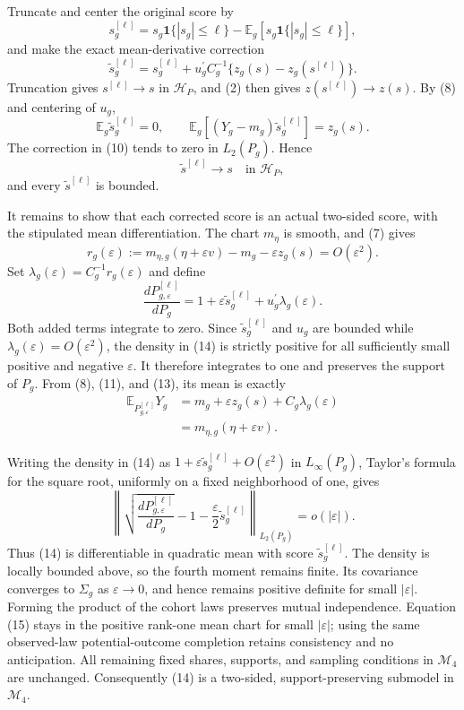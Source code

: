 Truncate and center the original score by
\[
s_g^{[\ell]}
=s_g\mathbf 1\{|s_g|\le\ell\}
-\mathbb E_g[s_g\mathbf 1\{|s_g|\le\ell\}],
\]
and make the exact mean-derivative correction
\[
\widetilde s_g^{[\ell]}
=s_g^{[\ell]}
+u_g^{\prime}C_g^{-1}\{z_g(s)-z_g(s^{[\ell]})\}.                       \tag{10}
\]
Truncation gives \(s^{[\ell]}\to s\) in \(\mathcal H_P\), and (2) then gives
\(z(s^{[\ell]})\to z(s)\).  By (8) and centering of \(u_g\),
\[
\mathbb E_g\widetilde s_g^{[\ell]}=0,
\qquad
\mathbb E_g[(Y_g-m_g)\widetilde s_g^{[\ell]}]=z_g(s).                 \tag{11}
\]
The correction in (10) tends to zero in \(L_2(P_g)\).  Hence
\[
\widetilde s^{[\ell]}\longrightarrow s
\quad\text{in }\mathcal H_P,                                          \tag{12}
\]
and every \(\widetilde s^{[\ell]}\) is bounded.

It remains to show that each corrected score is an actual two-sided score, with the stipulated mean differentiation.  The chart \(m_\eta\) is smooth, and (7) gives
\[
r_g(\varepsilon)
:=m_{\eta,g}(\eta+\varepsilon v)-m_g-\varepsilon z_g(s)
=O(\varepsilon^2).                                                       \tag{13}
\]
Set \(\lambda_g(\varepsilon)=C_g^{-1}r_g(\varepsilon)\) and define
\[
\frac{dP_{g,\varepsilon}^{[\ell]}}{dP_g}
=1+\varepsilon\widetilde s_g^{[\ell]}
+u_g^{\prime}\lambda_g(\varepsilon).                                  \tag{14}
\]
Both added terms integrate to zero.  Since \(\widetilde s_g^{[\ell]}\) and \(u_g\) are bounded while \(\lambda_g(\varepsilon)=O(\varepsilon^2)\), the density in (14) is strictly positive for all sufficiently small positive and negative \(\varepsilon\).  It therefore integrates to one and preserves the support of \(P_g\).  From (8), (11), and (13), its mean is exactly
\[
\begin{aligned}
\mathbb E_{P_{g,\varepsilon}^{[\ell]}}Y_g
&=m_g+\varepsilon z_g(s)+C_g\lambda_g(\varepsilon)\\
&=m_{\eta,g}(\eta+\varepsilon v).                                    \tag{15}
\end{aligned}
\]

Writing the density in (14) as \(1+\varepsilon\widetilde s_g^{[\ell]}+O(\varepsilon^2)\) in \(L_\infty(P_g)\), Taylor's formula for the square root, uniformly on a fixed neighborhood of one, gives
\[
\left\|
\sqrt{\frac{dP_{g,\varepsilon}^{[\ell]}}{dP_g}}
-1-\frac{\varepsilon}{2}\widetilde s_g^{[\ell]}
\right\|_{L_2(P_g)}=o(|\varepsilon|).                                  \tag{16}
\]
Thus (14) is differentiable in quadratic mean with score \(\widetilde s_g^{[\ell]}\).  The density is locally bounded above, so the fourth moment remains finite.  Its covariance converges to \(\Sigma_g\) as \(\varepsilon\to0\), and hence remains positive definite for small \(|\varepsilon|\).  Forming the product of the cohort laws preserves mutual independence.  Equation (15) stays in the positive rank-one mean chart for small \(|\varepsilon|\); using the same observed-law potential-outcome completion retains consistency and no anticipation.  All remaining fixed shares, supports, and sampling conditions in \(\mathcal M_4\) are unchanged.  Consequently (14) is a two-sided, support-preserving submodel in \(\mathcal M_4\).

